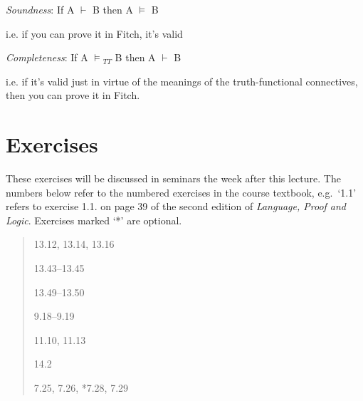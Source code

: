 \documentclass[12pt]{extarticle}
\begin{document}
\begin{multicols*}{3}
\emph{Soundness}: If A $\vdash$ B then A $\models$ B
 
\hspace{3mm} i.e. if you can prove it in Fitch, it’s valid
 
\emph{Completeness}: If A $\models$$_{TT}$ B then A $\vdash$ B
 
\hspace{3mm} i.e. if it’s valid just in virtue of the meanings of the truth-functional connectives, then you can prove it in Fitch.
 
\vfill
\begin{minipage}{\columnwidth}
\section{Exercises}
These exercises will be discussed in seminars the week after this lecture.
The numbers below refer to the numbered exercises in the course textbook, e.g.\ `1.1' refers to exercise 1.1. on page 39 of the second edition of \emph{Language, Proof and Logic}. Exercises marked `*' are optional.
 
\begin{quote}
13.12, 13.14, 13.16
 
13.43--13.45
 
13.49--13.50
 
9.18--9.19
 
11.10, 11.13
 
14.2
 
7.25, 7.26, *7.28, 7.29
 \end{quote}
\end{minipage}

 

\end{multicols*}
\end{document}
